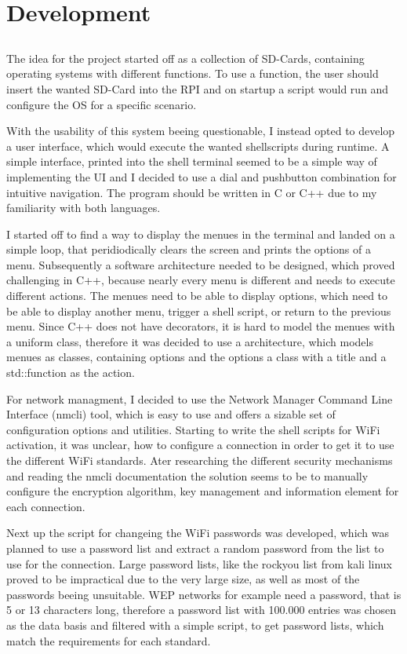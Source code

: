 \chapter{Development}\label{ch:development}

\section{}
The idea for the project started off as a collection of SD-Cards, containing operating systems with different functions.
To use a function, the user should insert the wanted SD-Card into the RPI and on startup a script would run and configure the OS for a specific scenario.

With the usability of this system beeing questionable, I instead opted to develop a user interface, which would execute the wanted shellscripts during runtime.
A simple interface, printed into the shell terminal seemed to be a simple way of implementing the UI and I decided to use a dial and pushbutton combination for intuitive navigation.
The program should be written in C or C++ due to my familiarity with both languages.

I started off to find a way to display the menues in the terminal and landed on a simple loop, that peridiodically clears the screen and prints the options of a menu.
Subsequently a software architecture needed to be designed, which proved challenging in C++, because nearly every menu is different and needs to execute different actions.
The menues need to be able to display options, which need to be able to display another menu, trigger a shell script, or return to the previous menu.
Since C++ does not have decorators, it is hard to model the menues with a uniform class, therefore it was decided to use a architecture, which models menues as classes, containing options and the options a class with a title and a std::function as the action.

For network managment, I decided to use the Network Manager Command Line Interface (nmcli) tool, which is easy to use and offers a sizable set of configuration options and utilities.
Starting to write the shell scripts for WiFi activation, it was unclear, how to configure a connection in order to get it to use the different WiFi standards.
Ater researching the different security mechanisms and reading the nmcli documentation the solution seems to be to manually configure the encryption algorithm, key management and information element for each connection.

Next up the script for changeing the WiFi passwords was developed, which was planned to use a password list and extract a random password from the list to use for the connection.
Large password lists, like the rockyou list from kali linux proved to be impractical due to the very large size, as well as most of the passwords beeing unsuitable.
WEP networks for example need a password, that is 5 or 13 characters long, therefore a password list with 100.000 entries was chosen as the data basis and filtered with a simple script, to get password lists, which match the requirements for each standard.


